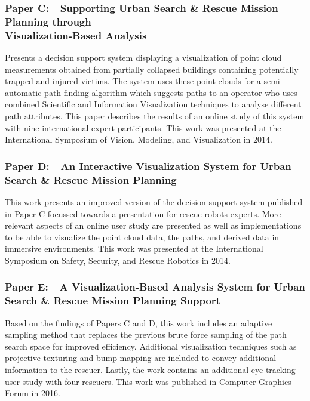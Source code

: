 \subsubsection{Paper C:~~Supporting Urban Search \& Rescue Mission Planning through \\Visualization-Based Analysis}
\vspace*{\absubsubsectionlength}
Presents a decision support system displaying a  visualization of point cloud measurements obtained from partially collapsed buildings containing potentially trapped and injured victims.  The system uses these point clouds for a semi-automatic path finding algorithm which suggests paths to an operator who uses combined Scientific and Information Visualization techniques to analyse different path attributes.  This paper describes the results of an online study of this system with nine international expert participants.  This work was presented at the International Symposium of Vision, Modeling, and Visualization in 2014.

\subsubsection{Paper D:~~An Interactive Visualization System for Urban Search \& Rescue Mission Planning}
\vspace*{\absubsubsectionlength}
This work presents an improved version of the decision support system published in Paper C focussed towards a presentation for rescue robots experts.  More relevant aspects of an online user study are presented as well as implementations to be able to visualize the point cloud data, the paths, and derived data in immersive environments.  This work was presented at the International Symposium on Safety, Security, and Rescue Robotics in 2014.

\subsubsection{Paper E:~~A Visualization-Based Analysis System for Urban Search \& Rescue Mission Planning Support}
\vspace*{\absubsubsectionlength}
Based on the findings of Papers C and D, this work includes an adaptive sampling method that replaces the previous brute force sampling of the path search space for improved efficiency.  Additional visualization techniques such as projective texturing and bump mapping are included to convey additional information to the rescuer.  Lastly, the work contains an additional eye-tracking user study with four rescuers.  This work was published in Computer Graphics Forum in 2016.

